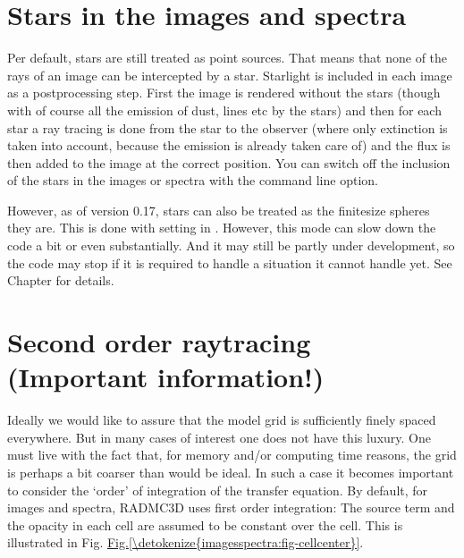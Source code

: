 \documentclass[letterpaper,10pt,english]{sphinxmanual}
\begin{document}
\section{Stars in the images and spectra}
\label{\detokenize{imagesspectra:stars-in-the-images-and-spectra}}\label{\detokenize{imagesspectra:sec-image-stars}}
Per default, stars are still treated as point sources. That means that none of
the rays of an image can be intercepted by a star. Starlight is included in each
image as a post\sphinxhyphen{}processing step. First the image is rendered without the stars
(though with of course all the emission of dust, lines etc  by the
stars) and then for each star a ray tracing is done from the star to the
observer (where only extinction is taken into account, because the emission is
already taken care of) and the flux is then added to the image at the correct
position. You can switch off the inclusion of the stars in the images or spectra
with the  command line option.

However, as of version 0.17, stars can also be treated as the finite\sphinxhyphen{}size
spheres they are. This is done with setting  in
. However, this mode can slow down the code a bit or
even substantially. And it may still be partly under development, so the
code may stop if it is required to handle a situation it cannot handle yet.
See Chapter {\hyperref[\detokenize{stars:chap-stars}]{}} for details.


\section{Second order ray\sphinxhyphen{}tracing (Important information!)}
\label{\detokenize{imagesspectra:second-order-ray-tracing-important-information}}\label{\detokenize{imagesspectra:sec-second-order}}
Ideally we would like to assure that the model grid is sufficiently finely
spaced everywhere. But in many cases of interest one does not have this
luxury. One must live with the fact that, for memory and/or computing time
reasons, the grid is perhaps a bit coarser than would be ideal. In such a
case it becomes important to consider the ‘order’ of integration of the
transfer equation. By default, for images and spectra, RADMC\sphinxhyphen{}3D uses first
order integration: The source term and the opacity in each cell are assumed
to be constant over the cell. This is illustrated in
Fig. \hyperref[\detokenize{imagesspectra:fig-cellcenter}]{Fig.\@ \ref{\detokenize{imagesspectra:fig-cellcenter}}}.
\end{document}
